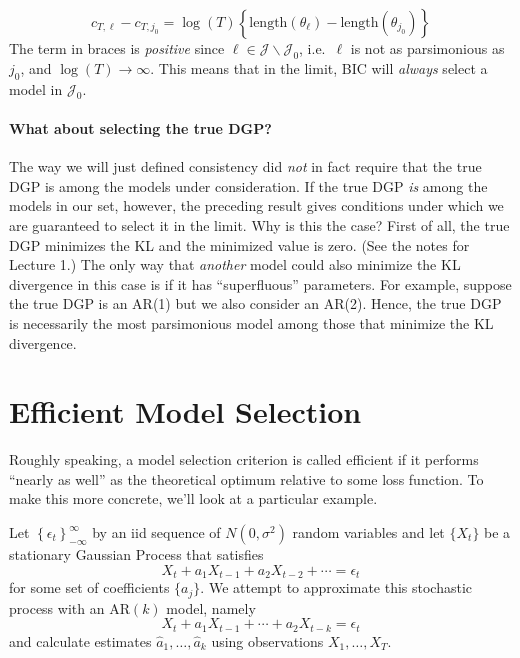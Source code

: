 \documentclass[12pt]{article}
\theoremstyle{definition}
\begin{document}
	$$c_{T,\ell} - c_{T,j_0} = \log(T) \left\{\mbox{length}(\theta_\ell) - \mbox{length}(\theta_{j_0}) \right\}$$
The term in braces is \emph{positive} since $\ell \in\mathcal{J}\backslash \mathcal{J}_0$, i.e.\ $\ell$ is not as parsimonious as $j_0$, and $\log(T) \rightarrow \infty$. This means that in the limit, BIC will \emph{always} select a model in $\mathcal{J}_0$.

\paragraph{What about selecting the true DGP?}
The way we will just defined consistency did \emph{not} in fact require that the true DGP is among the models under consideration. If the true DGP \emph{is} among the models in our set, however, the preceding result gives conditions under which we are guaranteed to select it in the limit. Why is this the case? First of all, the true DGP minimizes the KL and the minimized value is zero. (See the notes for Lecture 1.) The only way that \emph{another} model could also minimize the KL divergence in this case is if it has ``superfluous'' parameters. For example, suppose the true DGP is an AR(1) but we also consider an AR(2). Hence, the true DGP is necessarily the most parsimonious model among those that minimize the KL divergence. 


\section{Efficient Model Selection}
Roughly speaking, a model selection criterion is called efficient if it performs ``nearly as well'' as the theoretical optimum relative to some loss function. To make this more concrete, we'll look at a particular example.

Let $\left\{\epsilon_t\right\}_{-\infty}^{\infty}$ by an iid sequence of $N(0,\sigma^2)$ random variables and let $\{X_t\}$ be a stationary Gaussian Process that satisfies
$$X_t + a_1 X_{t-1} + a_2 X_{t-2} + \cdots  = \epsilon_t$$  
for some set of coefficients $\{a_j\}$. We attempt to approximate this stochastic process with an AR$(k)$ model, namely
$$X_t + a_1 X_{t-1} + \cdots + a_2 X_{t-k}  = \epsilon_t$$  
and calculate estimates $\widehat{a}_1, \hdots, \widehat{a}_k$ using observations $X_1, \hdots, X_T$.


\end{document}
